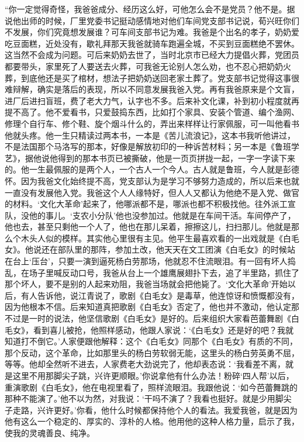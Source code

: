 \par “你一定觉得奇怪，我爸爸成分、经历这么好，可他怎么会不是党员？他不是。据说他出师的时候，厂里党委书记挺动感情地对他们车间党支部书记说，荀兴旺你们不发展，你们究竟想发展谁？可车间支部书记为难。我爸是个出名的孝子，奶奶爱吃豆面糕，近处没有，歇礼拜那天我爸就骑车跑遍全城，不买到豆面糕绝不罢休。这当然不会成为问题。可后来奶奶去世了，当时北京市已经大力提倡火葬，党团员都要带头，家里死了人要送去火葬，可我爸无论别人怎么劝，也不忍心把奶奶火葬，到底他还是买了棺材，想法子把奶奶送回老家土葬了。党支部书记觉得这事很难辩解，确实是落后的表现，所以不同意发展我爸入党。再有我爸原来是个文盲，进厂后进扫盲班，费了老大力气，认字也不多。后来补文化课，补到初小程度就再提不高了。他不爱看书，只爱鼓捣东西，比如打个家具、安装个管道、编个渔网、修理个自行车、修个鞋、旋个烟斗什么的，弄出来样样让行家佩服，可一叫他看书他就头疼。他一生只精读过两本书，一本是《苦儿流浪记》，这本书我听他讲过，不是法国那个马洛写的那本，好像是解放初印的一种诉苦材料；另一本是《鲁班学艺》，据他说他得到的那本书页已被撕破，他是一页页拼拢一起，一字一字读下来的。他一生最佩服的是两个人，一个古人一个今人。古人就是鲁班，今人就是彭德怀。因为我爸文化始终提不高，党支部认为是学习不够努力造成的，所以后来也就一直没有发展他入党。我爸这个人人缘特好，但人人又都认为他绝不是入党、做官的材料。‘文化大革命’起来了，他哪派都不是，哪派也都不积极找他。往外派工宣队，没他的事儿。‘支农小分队’他也没参加过。他就是在车间干活。车间停产了，他也去，甚至只剩他一个人了，他也在那儿呆着，擦擦这儿，扫扫那儿。他就是那么个木头人似的模样。其实他心里很有主见。他平生最喜欢看的一出戏就是《白毛女》。他说还在部队里的那阵，参加土改，他天天在文工团演《白毛女》的时候站在台上‘压台’，只要一演到逼死杨白劳那场，他就忍不住流眼泪。有一回有坏人捣乱，在场子里喊反动口号，我爸从台上一个雄鹰展翅扑下去，追了半里路，抓住了那个坏人，要不是别的人起来劝阻，我爸当场就会把他毙了。‘文化大革命’开始以后，有人告诉他，说江青说了，歌剧《白毛女》是毒草，他连惊讶和愤慨都没有，因为他根本不信。后来知道真把歌剧《白毛女》否定了，他也并不激动，他认定那不过是一时的说法，他坚信歌剧《白毛女》是好的。后来组织大家看芭蕾舞剧《白毛女》，看到喜儿被抢，他照样感动，他跟人家说：‘《白毛女》还是好的吧？我就知道打不倒它。’人家便跟他解释：这个《白毛女》同那个《白毛女》有质的不同，那个反动，这个革命，比如那里头的杨白劳软弱无能，这里头的杨白劳英勇不屈，等等。他却全然听不进去，人家费老大劲说完了，他却表态说：‘我看差不离，就是这里不用那脚尖子跳，兴许更顺眼。’你说拿他有什么办法！粉碎‘四人帮’以后，重演歌剧《白毛女》，他在电视里看了，照样流眼泪。我跟他说：‘如今芭蕾舞跳的那种不能演了。’他不以为然，对我说：‘干吗不演了？我看也挺好。就是少用脚尖子走路，兴许更好。’你看，他什么时候都保持他个人的看法。我爱我爸，就是因为他有这么一个稳定的、厚实的、淳朴的人格。他用他的这种人格力量，启示了我，使我的灵魂善良、纯净。
